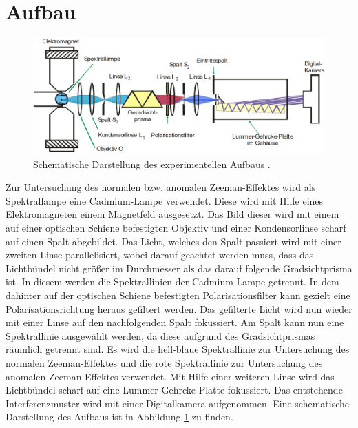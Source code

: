 \section{Aufbau}
\label{sec:Aufbau}
\begin{figure}
	\centering
	\includegraphics[width=\linewidth-50pt,height=\textheight-50pt,keepaspectratio]{content/Images/schema.png}
	\caption{Schematische Darstellung des experimentellen Aufbaus \cite{V27}.}
	\label{fig:schema}
\end{figure}

Zur Untersuchung des normalen bzw. anomalen Zeeman-Effektes wird als Spektrallampe eine Cadmium-Lampe verwendet. Diese wird mit Hilfe eines Elektromagneten einem Magnetfeld ausgesetzt. Das Bild dieser wird mit einem auf einer optischen Schiene befestigten Objektiv und einer Kondensorlinse scharf auf einen Spalt abgebildet. Das Licht, welches den Spalt passiert wird mit einer zweiten Linse parallelisiert, wobei darauf geachtet werden muss, dass das Lichtbündel nicht größer im Durchmesser als das darauf folgende Gradsichtprisma ist. In diesem werden die Spektrallinien der Cadmium-Lampe getrennt. In dem dahinter auf der optischen Schiene befestigten Polarisationsfilter kann gezielt eine Polarisationsrichtung heraus gefiltert werden. Das gefilterte Licht wird nun wieder mit einer Linse auf den nachfolgenden Spalt fokussiert. Am Spalt kann nun eine Spektrallinie ausgewählt werden, da diese aufgrund des Gradsichtprismas räumlich getrennt sind. Es wird die hell-blaue Spektrallinie zur Untersuchung des normalen Zeeman-Effektes und die rote Spektrallinie zur Untersuchung des anomalen Zeeman-Effektes verwendet. Mit Hilfe einer weiteren Linse wird das Lichtbündel scharf auf eine Lummer-Gehrcke-Platte fokussiert. Das entstehende Interferenzmuster wird mit einer Digitalkamera aufgenommen. Eine schematische Darstellung des Aufbaus ist in Abbildung \ref{fig:schema} zu finden.